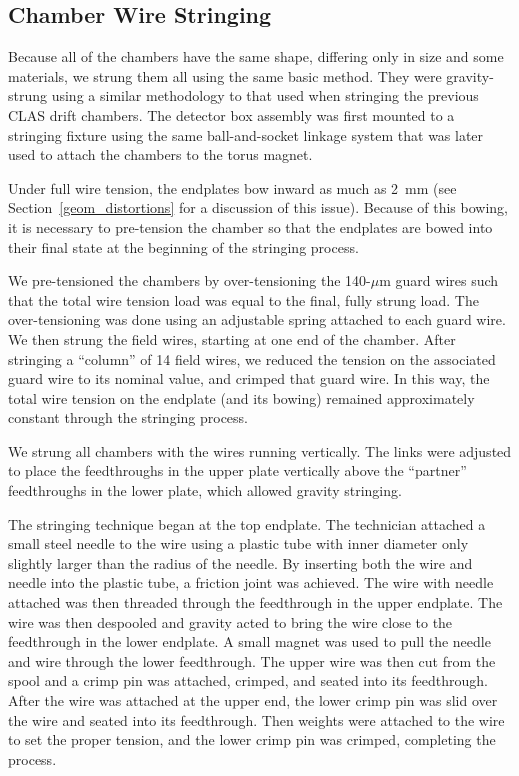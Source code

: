 \subsection{Chamber Wire Stringing}
\label{stringing}

Because all of the chambers have the same shape, differing only in
size and some materials, we strung them all using the same basic method.
They were gravity-strung using a similar methodology to that 
used when stringing the previous CLAS drift chambers.  The detector box 
assembly was first mounted to a stringing fixture using the same
ball-and-socket linkage system that was later used to attach the
chambers to the torus magnet.  

Under full wire tension, the endplates bow inward as much as 2~mm 
(see Section~\ref{geom_distortions} for a discussion of this issue).
Because of this bowing, it is necessary to pre-tension the chamber
so that the endplates are bowed into their final state at the 
beginning of the stringing process.

We pre-tensioned the chambers by over-tensioning the 140-$\mu$m guard
wires such that the total wire tension load was equal to the final, 
fully strung load.  The over-tensioning was done using an adjustable
spring attached to each guard wire. 
We then strung the field wires, starting at one end of the chamber.
After stringing a ``column'' of 14 field wires, we reduced the
tension on the associated guard wire to its nominal value, and crimped
that guard wire.  In this way, the total wire tension on the endplate
(and its bowing) remained approximately constant through the stringing process.

We strung all chambers with 
the wires running vertically.  The links were adjusted to place the 
feedthroughs in the upper plate vertically above the ``partner''
feedthroughs in the lower plate, which allowed gravity stringing.

The stringing technique began at the top endplate. The technician attached a 
small steel needle to the wire using a plastic tube with inner diameter only
slightly larger than the radius of the needle. By inserting both the wire and
needle into the plastic tube, a friction joint was achieved.  
The wire with needle attached was then threaded through the feedthrough in 
the upper endplate. The wire was then despooled and gravity acted to bring the 
wire close to the feedthrough in the lower endplate.  A small magnet was 
used to pull the needle and wire through the lower feedthrough. The upper wire
was then cut from the spool and a crimp pin was attached, crimped, and seated into
its feedthrough.  After the wire was attached at the upper end, the lower 
crimp pin was slid over the wire and seated into its feedthrough.  Then 
weights were attached to the wire to set the 
proper tension, and the lower crimp pin was crimped, completing the process.

